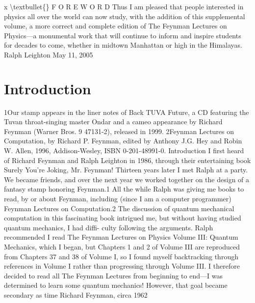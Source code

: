 \documentclass[10pt,oneside]{article}
\begin{document}
x \textbackslash{}textbullet\{\} F O R E W O R D Thus I am pleased that people interested in physics all over the world can now study, with the addition of this supplemental volume, a more correct and complete edition of The Feynman Lectures on Physics---a monumental work that will continue to inform and inspire students for decades to come, whether in midtown Manhattan or high in the Himalayas. Ralph Leighton May 11, 2005\par

\clearpage
{}
\section*{Introduction}
\label{tips-sec-3-introduction}
1Our stamp appears in the liner notes of Back TUVA Future, a CD featuring the Tuvan throat-singing master Ondar and a cameo appearance by Richard Feynman (Warner Bros. 9 47131-2), released in 1999. 2Feynman Lectures on Computation, by Richard P. Feynman, edited by Anthony J.G. Hey and Robin W. Allen, 1996, Addison-Wesley, ISBN 0-201-48991-0. Introduction I first heard of Richard Feynman and Ralph Leighton in 1986, through their entertaining book Surely You’re Joking, Mr. Feynman! Thirteen years later I met Ralph at a party. We became friends, and over the next year we worked together on the design of a fantasy stamp honoring Feynman.1 All the while Ralph was giving me books to read, by or about Feynman, including (since I am a computer programmer) Feynman Lectures on Computation.2 The discussion of quantum mechanical computation in this fascinating book intrigued me, but without having studied quantum mechanics, I had diffi- culty following the arguments. Ralph recommended I read The Feynman Lectures on Physics Volume III: Quantum Mechanics, which I began, but Chapters 1 and 2 of Volume III are reproduced from Chapters 37 and 38 of Volume I, so I found myself backtracking through references in Volume I rather than progressing through Volume III. I therefore decided to read all The Feynman Lectures from beginning to end---I was determined to learn some quantum mechanics! However, that goal became secondary as time Richard Feynman, circa 1962\par
\end{document}
